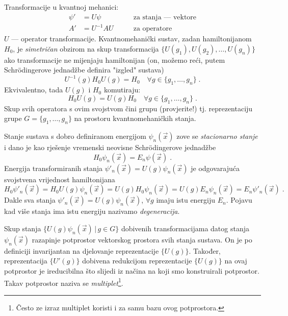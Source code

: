 Transformacije u kvantnoj mehanici:
\begin{align*}
 \psi' &= U \psi \qquad &\text{za stanja --- vektore} \\
   A' &= U^{-1} A U \qquad &\text{za operatore}
\end{align*}
$U$ --- operator transformacije. Kvantnomehanički sustav, zadan
hamiltonijanom $H_0$, je \emph{simetričan} obzirom na skup transformacija
$\{ U(g_1), U(g_2), \ldots, U(g_n)\}$ ako transformacije ne mijenjaju
hamiltonijan (on, možemo reći, putem Schr\"{o}dingerove jednadžbe definira "izgled"
sustava)
\begin{displaymath}
U^{-1}(g) H_{0} U(g) = H_{0} \quad \forall  g \in \{g_1,\ldots, g_n\}\;.
\end{displaymath}
Ekvivalentno, tada $U(g)$ i $H_0$ komutiraju:
\begin{displaymath}
  H_{0}U(g)=U(g)H_0 \quad \forall  g \in \{g_1,\ldots, g_n\} \;.
\end{displaymath}
Skup svih operatora s ovim svojstvom čini grupu (provjerite!) tj.
reprezentaciju grupe $G=\{g_1,\ldots, g_n\}$ na prostoru kvantnomehaničkih 
stanja.

Stanje sustava s dobro definiranom energijom $\psi_n(\vec{x})$ zove se
\emph{stacionarno stanje} i dano je kao rješenje vremenski 
neovisne Schr\"{o}dingerove jednadžbe
\begin{displaymath}
  H_0 \psi_n(\vec{x}) = E_n \psi(\vec{x}) \;.
\end{displaymath}
Energija transformiranih stanja $\psi'_n(\vec{x}) = U(g)\psi_n(\vec{x})$ je
odgovarajuća svojstvena vrijednost hamiltonijana
\begin{displaymath}
  H_0 \psi'_n(\vec{x}) = H_0 U(g)\psi_n(\vec{x}) = U(g) H_0 \psi_n(\vec{x}) =
 U(g) E_n \psi_n(\vec{x}) = E_n \psi'_n(\vec{x}) \;.
\end{displaymath}
Dakle sva stanja $\psi'_n(\vec{x}) = U(g)\psi_n(\vec{x})$, $\forall g$ imaju
istu energiju $E_n$. Pojavu kad više stanja ima istu energiju 
nazivamo \emph{degeneracija}.

Skup stanja $\{U(g)\psi_n(\vec{x}) \,|\, g\in G\}$ dobivenih transformacijama
datog stanja $\psi_n(\vec{x})$ razapinje
potprostor vektorskog prostora svih stanja sustava. On je
po definiciji invarijantan na djelovanje reprezentacije $\{ U(g) \}$.
Također, reprezentacija $\{ U'(g) \}$ dobivena redukcijom reprezentacije
$\{ U(g) \}$ na ovaj potprostor je ireducibilna što slijedi
iz načina na koji smo konstruirali potprostor.
Takav potprostor naziva se \emph{multiplet}\footnote{Često ze izraz
multiplet koristi i za samu bazu ovog potprostora.}.

